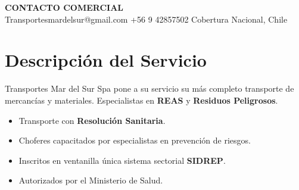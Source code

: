 \documentclass[11pt, a4paper]{article}
\begin{document}
\vfill

\begin{center}
    \color{dark}
    \textbf{CONTACTO COMERCIAL}\\
    \vspace{0.2cm}
    \faEnvelope \hspace{0.2cm} Transportesmardelsur@gmail.com \hspace{1cm} 
    \faPhone \hspace{0.2cm} +56 9 42857502 \hspace{1cm}
    \faMapMarker* \hspace{0.2cm} Cobertura Nacional, Chile
\end{center}

\newpage



\vspace{2cm}

\section*{\color{hazard}\faTruck \hspace{0.2cm} Descripción del Servicio}
Transportes Mar del Sur Spa pone a su servicio su más completo transporte de mercancías y materiales. Especialistas en \textbf{REAS} y \textbf{Residuos Peligrosos}.
\begin{itemize}
    \item Transporte con \textbf{Resolución Sanitaria}.
    \item Choferes capacitados por especialistas en prevención de riesgos.
    \item Inscritos en ventanilla única sistema sectorial \textbf{SIDREP}.
    \item Autorizados por el Ministerio de Salud.
\end{itemize}
\end{document}
